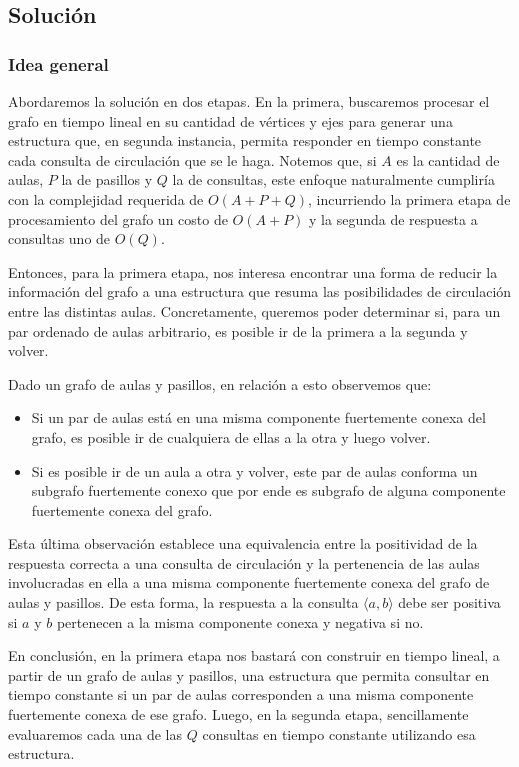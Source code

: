 \subsection{Solución}

\subsubsection{Idea general}

Abordaremos la solución en dos etapas. En la primera, buscaremos procesar el grafo en tiempo lineal en su cantidad de vértices y ejes para generar una estructura que, en segunda instancia, permita responder en tiempo constante cada consulta de circulación que se le haga. Notemos que, si $A$ es la cantidad de aulas, $P$ la de pasillos y $Q$ la de consultas, este enfoque naturalmente cumpliría con la complejidad requerida de $O(A+P+Q)$, incurriendo la primera etapa de procesamiento del grafo un costo de $O(A+P)$ y la segunda de respuesta a consultas uno de $O(Q)$.

Entonces, para la primera etapa, nos interesa encontrar una forma de reducir la información del grafo a una estructura que resuma las posibilidades de circulación entre las distintas aulas. Concretamente, queremos poder determinar si, para un par ordenado de aulas arbitrario, es posible ir de la primera a la segunda y volver.

Dado un grafo de aulas y pasillos, en relación a esto observemos que:
\begin{itemize}
    \item Si un par de aulas está en una misma componente fuertemente conexa del grafo, es posible ir de cualquiera de ellas a la otra y luego volver.
    \item Si es posible ir de un aula a otra y volver, este par de aulas conforma un subgrafo fuertemente conexo que por ende es subgrafo de alguna componente fuertemente conexa del grafo.
\end{itemize}

Esta última observación establece una equivalencia entre la positividad de la respuesta correcta a una consulta de circulación y la pertenencia de las aulas involucradas en ella a una misma componente fuertemente conexa del grafo de aulas y pasillos. De esta forma, la respuesta a la consulta $\langle a,b \rangle$ debe ser positiva si $a$ y $b$ pertenecen a la misma componente conexa y negativa si no.

En conclusión, en la primera etapa nos bastará con construir en tiempo lineal, a partir de un grafo de aulas y pasillos, una estructura que permita consultar en tiempo constante si un par de aulas corresponden a una misma componente fuertemente conexa de ese grafo. Luego, en la segunda etapa, sencillamente evaluaremos cada una de las $Q$ consultas en tiempo constante utilizando esa estructura.

